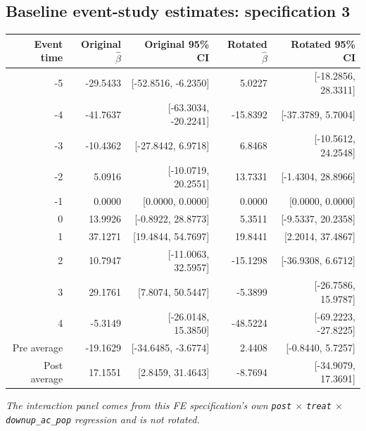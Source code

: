 \documentclass[10pt]{article}
\begin{document}
\subsection*{Baseline event-study estimates: specification 3}
\begin{center}
\scriptsize
\begin{tabular}{r rr rr}
\toprule
Event time & Original $\hat\beta$ & Original 95\% CI & Rotated $\hat\beta$ & Rotated 95\% CI \\
\midrule
-5 & -29.5433 & [-52.8516, -6.2350] & 5.0227 & [-18.2856, 28.3311] \\
-4 & -41.7637 & [-63.3034, -20.2241] & -15.8392 & [-37.3789, 5.7004] \\
-3 & -10.4362 & [-27.8442, 6.9718] & 6.8468 & [-10.5612, 24.2548] \\
-2 & 5.0916 & [-10.0719, 20.2551] & 13.7331 & [-1.4304, 28.8966] \\
-1 & 0.0000 & [0.0000, 0.0000] & 0.0000 & [0.0000, 0.0000] \\
0 & 13.9926 & [-0.8922, 28.8773] & 5.3511 & [-9.5337, 20.2358] \\
1 & 37.1271 & [19.4844, 54.7697] & 19.8441 & [2.2014, 37.4867] \\
2 & 10.7947 & [-11.0063, 32.5957] & -15.1298 & [-36.9308, 6.6712] \\
3 & 29.1761 & [7.8074, 50.5447] & -5.3899 & [-26.7586, 15.9787] \\
4 & -5.3149 & [-26.0148, 15.3850] & -48.5224 & [-69.2223, -27.8225] \\
\midrule
Pre average & -19.1629 & [-34.6485, -3.6774] & 2.4408 & [-0.8440, 5.7257] \\
Post average & 17.1551 & [2.8459, 31.4643] & -8.7694 & [-34.9079, 17.3691] \\
\bottomrule
\end{tabular}
\end{center}
\medskip
\textit{The interaction panel comes from this FE specification's own \texttt{post} $\times$ \texttt{treat} $\times$ \texttt{downup\_ac\_pop} regression and is not rotated.}
\clearpage
\end{document}
